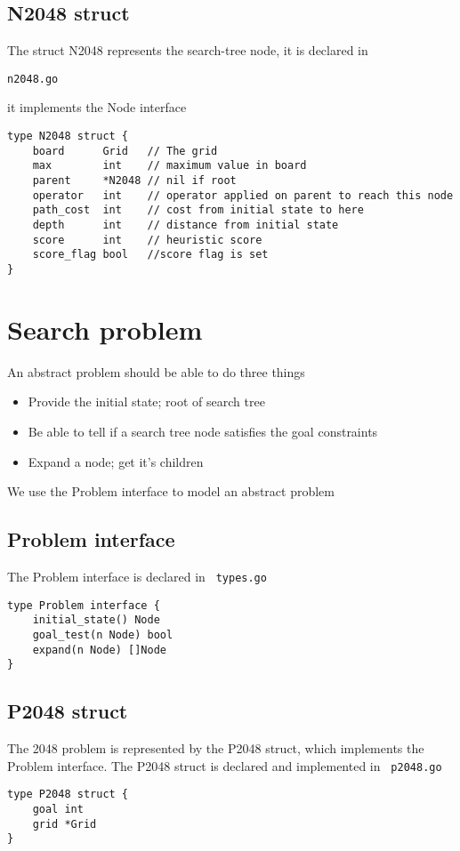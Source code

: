 \documentclass[14pt,a4paper]{report}
\begin{document}
\subsection{N2048 struct}
The struct N2048 represents the search-tree node, it is declared in 
\begin{verbatim}n2048.go\end{verbatim} it implements the Node interface 
\begin{lstlisting}
type N2048 struct {
    board      Grid   // The grid
    max        int    // maximum value in board
    parent     *N2048 // nil if root
    operator   int    // operator applied on parent to reach this node
    path_cost  int    // cost from initial state to here
    depth      int    // distance from initial state
    score      int    // heuristic score
    score_flag bool   //score flag is set
}
\end{lstlisting}
\vfill


\section{Search problem}
An abstract problem should be able to do three things
\begin{itemize}
\item Provide the initial state; root of search tree
\item Be able to tell if a search tree node satisfies the goal constraints
\item Expand a node; get it's children
\end{itemize}
We use the Problem interface to model an abstract problem

\subsection{Problem interface}
The Problem interface is declared in \verb+ types.go+ 
\begin{lstlisting}
type Problem interface {
    initial_state() Node
    goal_test(n Node) bool
    expand(n Node) []Node
}
\end{lstlisting}
\subsection{P2048 struct}
The 2048 problem is represented by the P2048 struct, which implements the Problem interface.
The P2048 struct is declared and implemented in \verb+ p2048.go+
\begin{lstlisting}
type P2048 struct {
    goal int
    grid *Grid
}
\end{lstlisting}
\vfill
\end{document}
